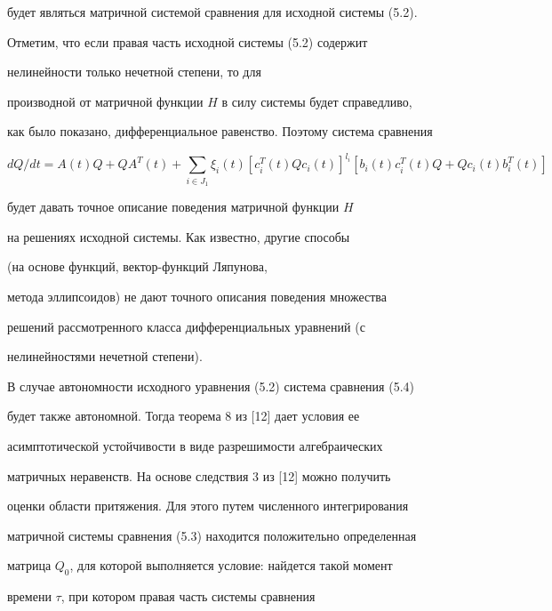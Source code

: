 будет являться матричной системой сравнения для исходной системы (5.2). 


 


Отметим, что если правая часть исходной системы (5.2) содержит 


нелинейности только нечетной степени, то для 


производной от матричной функции $H$ в силу системы будет справедливо,


как было показано, дифференциальное равенство. Поэтому система сравнения 


\begin{equation} 


d Q/d t=A(t)Q+Q A^T(t)+\sum_{i\in J_1}\xi_i(t) 


[c^T_i(t)Q c_i(t)]^{l_i}[b_i(t)c^T_i(t)Q+ 


Q c_i(t)b^T_i(t)] 


\end{equation} 


будет давать точное описание поведения матричной функции $H$ 


на решениях исходной системы. Как известно, другие способы


(на основе функций, вектор-функций Ляпунова, 


метода эллипсоидов) не дают точного описания поведения множества 


решений рассмотренного класса дифференциальных уравнений (с 


нелинейностями нечетной степени). 


 


В случае автономности исходного уравнения (5.2) система сравнения (5.4) 


будет также автономной. Тогда теорема 8 из [12] дает условия ее 


асимптотической устойчивости в виде разрешимости алгебраических 


матричных неравенств. На основе следствия 3 из [12] можно получить 


оценки области притяжения. Для этого путем численного интегрирования 


матричной системы сравнения (5.3) находится положительно определенная 


матрица $Q_0$, для которой выполняется условие: найдется такой момент 


времени $\tau$, при котором правая часть системы сравнения 


